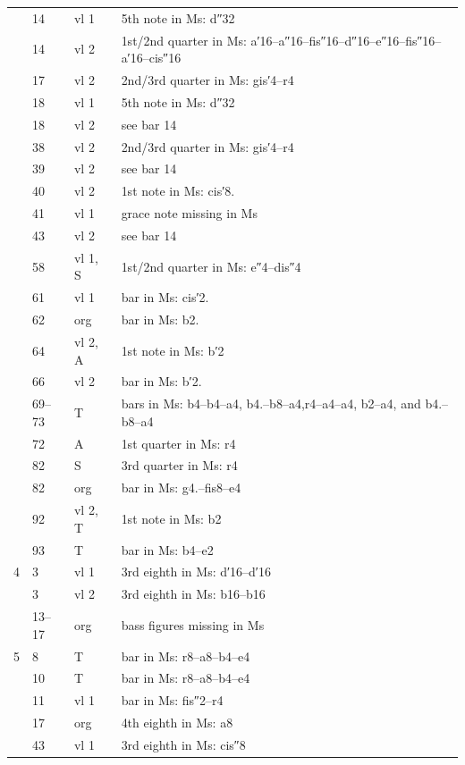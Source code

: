 \documentclass[parskip=full]{scrreprt}
\begin{document}
\begin{longtable}{lll L{10cm}}
	  & 14  & vl 1    & 5th note in Ms: d″32 \\
	  & 14  & vl 2    & 1st/2nd quarter in Ms: a′16–a″16–fis″16–d″16–e″16–fis″16–a′16–cis″16 \\
	  & 17  & vl 2    & 2nd/3rd quarter in Ms: gis′4–r4 \\
	  & 18  & vl 1    & 5th note in Ms: d″32 \\
	  & 18  & vl 2    & see bar 14 \\
	  & 38  & vl 2    & 2nd/3rd quarter in Ms: gis′4–r4 \\
	  & 39  & vl 2    & see bar 14 \\
	  & 40  & vl 2    & 1st note in Ms: cis′8. \\
	  & 41  & vl 1    & grace note missing in Ms \\
	  & 43  & vl 2    & see bar 14 \\
	  & 58  & vl 1, S & 1st/2nd quarter in Ms: e″4–dis″4 \\
	  & 61  & vl 1    & bar in Ms: cis′2. \\
	  & 62  & org     & bar in Ms: b2. \\
	  & 64  & vl 2, A & 1st note in Ms: b′2 \\
	  & 66  & vl 2    & bar in Ms: b′2. \\
	  & 69–73 & T     & bars in Ms: b4–b4–a4, b4.–b8–a4,\newline r4–a4–a4, b2–a4, and b4.–b8–a4 \\
	  & 72  & A       & 1st quarter in Ms: r4 \\
	  & 82  & S       & 3rd quarter in Ms: r4 \\
	  & 82  & org     & bar in Ms: g4.–fis8–e4 \\
	  & 92  & vl 2, T & 1st note in Ms: b2 \\
	  & 93  & T       & bar in Ms: b4–e2 \\
	4 & 3   & vl 1    & 3rd eighth in Ms: d′16–d′16 \\	
	  & 3   & vl 2    & 3rd eighth in Ms: b16–b16 \\ 
	  & 13–17 & org   & bass figures missing in Ms \\
	5 & 8   & T       & bar in Ms: r8–a8–b4–e4 \\
	  & 10  & T       & bar in Ms: r8–a8–b4–e4 \\
	  & 11  & vl 1    & bar in Ms: fis″2–r4 \\
	  & 17  & org     & 4th eighth in Ms: a8 \\
	  & 43  & vl 1    & 3rd eighth in Ms: cis″8 \\
	\bottomrule
\end{longtable}
\end{document}
